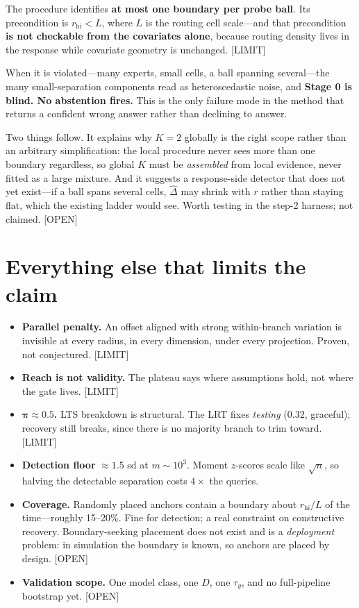 \documentclass[11pt]{article}
\newcommand{\Dhat}{\hat{\Delta}}
\newcommand{\provtag}[2]{{\footnotesize\sffamily\textcolor{#1}{[#2]}}}
\newcommand{\OPENT}{\provtag{openamber}{OPEN}}
\newcommand{\LIMIT}{\provtag{limred}{LIMIT}}
\begin{document}
\begin{limitbox}
\noindent The procedure identifies \textbf{at most one boundary per probe ball}. Its precondition
is $r_{\text{hi}} < L$, where $L$ is the routing cell scale---and that precondition \textbf{is not
checkable from the covariates alone}, because routing density lives in the response while
covariate geometry is unchanged. \LIMIT
\end{limitbox}

\noindent When it is violated---many experts, small cells, a ball spanning several---the many
small-separation components read as heteroscedastic noise, and \textbf{Stage 0 is blind. No
abstention fires.} This is the only failure mode in the method that returns a confident wrong
answer rather than declining to answer.

Two things follow. It explains why $K = 2$ globally is the right scope rather than an arbitrary
simplification: the local procedure never sees more than one boundary regardless, so global $K$
must be \emph{assembled} from local evidence, never fitted as a large mixture. And it suggests a
response-side detector that does not yet exist---if a ball spans several cells, $\Dhat$ may shrink
with $r$ rather than staying flat, which the existing ladder would see. Worth testing in the
step-2 harness; not claimed. \OPENT

\section{Everything else that limits the claim}
\label{sec:limits}

\begin{itemize}
\item \textbf{Parallel penalty.} An offset aligned with strong within-branch variation is invisible
at every radius, in every dimension, under every projection. Proven, not conjectured. \LIMIT
\item \textbf{Reach is not validity.} The plateau says where assumptions hold, not where the gate
lives. \LIMIT
\item $\bm{\pi \approx 0.5}$\textbf{.} LTS breakdown is structural. The LRT fixes \emph{testing}
($0.32$, graceful); recovery still breaks, since there is no majority branch to trim toward.
\LIMIT
\item \textbf{Detection floor} $\approx 1.5$ sd at $m \sim 10^3$. Moment $z$-scores scale like
$\sqrt{n}$, so halving the detectable separation costs $4\times$ the queries.
\item \textbf{Coverage.} Randomly placed anchors contain a boundary about $r_{\text{hi}}/L$ of the
time---roughly 15--20\%. Fine for detection; a real constraint on constructive recovery.
Boundary-seeking placement does not exist and is a \emph{deployment} problem: in simulation the
boundary is known, so anchors are placed by design. \OPENT
\item \textbf{Validation scope.} One model class, one $D$, one $\tau_y$, and no full-pipeline
bootstrap yet. \OPENT
\end{itemize}
\end{document}
